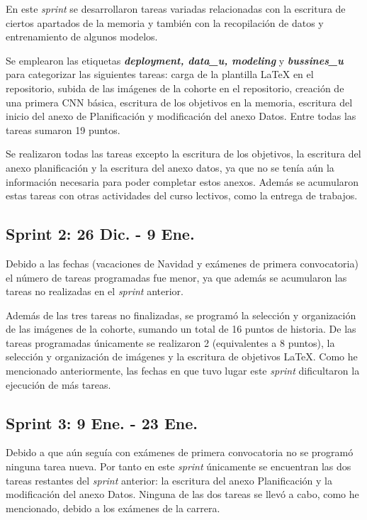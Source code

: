 En este \textit{sprint} se desarrollaron tareas variadas relacionadas con la escritura de ciertos apartados de la memoria y también con la recopilación de datos y entrenamiento de algunos modelos.

Se emplearon las etiquetas \textbf{\textit{deployment, data\_u, modeling}} y \textbf{\textit{bussines\_u}} para categorizar las siguientes tareas: carga de la plantilla LaTeX en el repositorio, subida de las imágenes de la cohorte en el repositorio, creación de una primera CNN básica, escritura de los objetivos en la memoria, escritura del inicio del anexo de Planificación y modificación del anexo Datos. Entre todas las tareas sumaron 19 puntos.

Se realizaron todas las tareas excepto la escritura de los objetivos, la escritura del anexo planificación y la escritura del anexo datos, ya que no se tenía aún la información necesaria para poder completar estos anexos. Además se acumularon estas tareas con otras actividades del curso lectivos, como la entrega de trabajos.

\subsection{Sprint 2: 26 Dic. - 9 Ene.}

Debido a las fechas (vacaciones de Navidad y exámenes de primera convocatoria) el número de tareas programadas fue menor, ya que además se acumularon las tareas no realizadas en el \textit{sprint} anterior.

Además de las tres tareas no finalizadas, se programó la selección y organización de las imágenes de la cohorte, sumando un total de 16 puntos de historia. De las tareas programadas únicamente se realizaron 2 (equivalentes a 8 puntos), la selección y organización de imágenes y la escritura de objetivos LaTeX. Como he mencionado anteriormente, las fechas en que tuvo lugar este \textit{sprint} dificultaron la ejecución de más tareas.

\subsection{Sprint 3: 9 Ene. - 23 Ene.}

Debido a que aún seguía con exámenes de primera convocatoria no se programó ninguna tarea nueva. Por tanto en este \textit{sprint} únicamente se encuentran las dos tareas restantes del \textit{sprint} anterior: la escritura del anexo Planificación y la modificación del anexo Datos. Ninguna de las dos tareas se llevó a cabo, como he mencionado, debido a los exámenes de la carrera.

